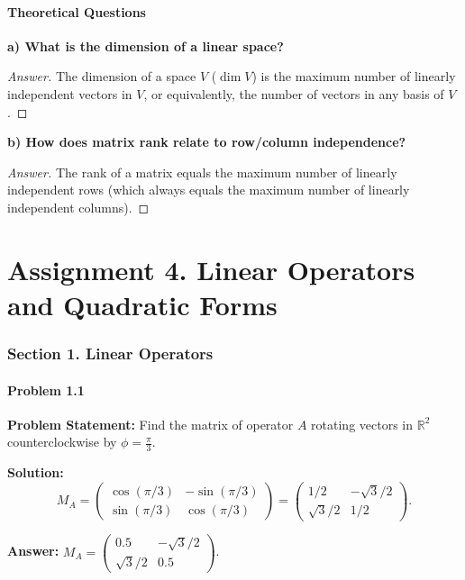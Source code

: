 \documentclass[11pt, a4paper]{article}
\begin{document}
\subsection*{Theoretical Questions}

\textbf{a) What is the dimension of a linear space?}
\begin{proof}[Answer]
The dimension of a space $V$ ($\dim V$) is the maximum number of linearly independent vectors in $V$, or equivalently, the number of vectors in any basis of $V$.
\end{proof}

\textbf{b) How does matrix rank relate to row/column independence?}
\begin{proof}[Answer]
The rank of a matrix equals the maximum number of linearly independent rows (which always equals the maximum number of linearly independent columns).
\end{proof}

\newpage

\part{Assignment 4. Linear Operators and Quadratic Forms}

\section{Section 1. Linear Operators}

\subsection*{Problem 1.1}
\textbf{Problem Statement:} Find the matrix of operator $A$ rotating vectors in $\mathbb{R}^2$ counterclockwise by $\phi = \frac{\pi}{3}$.

\textbf{Solution:}
$$ M_A = \begin{pmatrix} \cos(\pi/3) & -\sin(\pi/3) \\ \sin(\pi/3) & \cos(\pi/3) \end{pmatrix} = \begin{pmatrix} 1/2 & -\sqrt{3}/2 \\ \sqrt{3}/2 & 1/2 \end{pmatrix}. $$

\textbf{Answer:} $M_A = \begin{pmatrix} 0.5 & -\sqrt{3}/2 \\ \sqrt{3}/2 & 0.5 \end{pmatrix}$.
\end{document}
